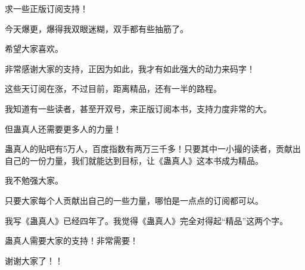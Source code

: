 \begin{this_body}
求一些正版订阅支持！

今天爆更，爆得我双眼迷糊，双手都有些抽筋了。

希望大家喜欢。

非常感谢大家的支持，正因为如此，我才有如此强大的动力来码字！

这些天订阅在涨，不过目前，距离精品，还有一半的路程。

我知道有一些读者，甚至开双号，来正版订阅本书，支持力度非常的大。

但蛊真人还需要更多人的力量！

蛊真人的贴吧有5万人，百度指数有两万三千多！只要其中一小撮的读者，贡献出自己的一份力量，我们就能达到目标，让《蛊真人》这本书成为精品。

我不勉强大家。

只要大家每个人贡献出自己的一些力量，哪怕是一点点的订阅都可以。

我写《蛊真人》已经四年了。我觉得《蛊真人》完全对得起“精品”这两个字。

蛊真人需要大家的支持！非常需要！

谢谢大家了！！

\end{this_body}

